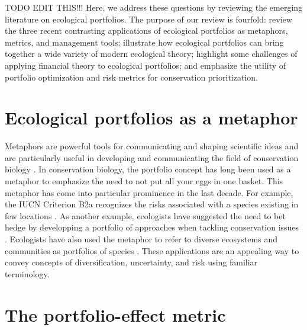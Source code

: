TODO EDIT THIS!!! Here, we address these questions by reviewing the emerging literature on ecological portfolios. The purpose of our review is fourfold: review the three recent contrasting applications of ecological portfolios as metaphors, metrics, and management tools; illustrate how ecological portfolios can bring together a wide variety of modern ecological theory; highlight some challenges of applying financial theory to ecological portfolios; and emphasize the utility of portfolio optimization and risk metrics for conservation prioritization.

\section{Ecological portfolios as a metaphor}\label{ecological-portfolios-as-a-metaphor}

Metaphors are powerful tools for communicating and shaping scientific ideas \citep{brown2003} and are particularly useful in developing and communicating the field of conservation biology \citep{larson2011}. In conservation biology, the portfolio concept has long been used as a metaphor to emphasize the need to not put all your eggs in one basket. This metaphor has come into particular prominence in the last decade. For example, the IUCN Criterion B2a recognizes the risks associated with a species existing in few locations \citep{iucn2001}. As another example, ecologists have suggested the need to bet hedge by developping a portfolio of approaches when tackling conservation issues \citep[e.g.][]{ehrlich2008}. Ecologists have also used the metaphor to refer to diverse ecosystems and communities as portfolios of species \citep{figge2004}. These applications are an appealing way to convey concepts of diversification, uncertainty, and risk using familiar terminology.

\section{The portfolio-effect metric}\label{the-portfolio-effect-metric}

